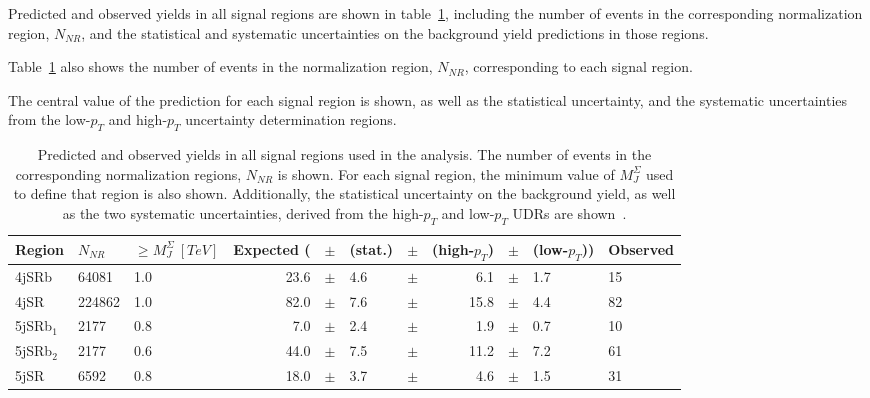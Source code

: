Predicted and observed yields in all signal regions are shown in table~\ref{tbl:results_yields_table},
including the number of events in the corresponding normalization region, $N_{NR}$, and the statistical and systematic
uncertainties on the background yield predictions in those regions.

Table~\ref{tbl:results_yields_table} also shows the number of events in the normalization region, $N_{NR}$,
corresponding to each signal region.

The central value of the prediction for each signal region is shown, as well as the statistical uncertainty,
and the systematic uncertainties from the low-$p_T$ and high-$p_T$ uncertainty determination regions.

\begin{table}[!ht]
    \centering

    \begin{tabular}{lllrlllrlll}
        \toprule
        Region & $N_{NR}$ & $\geq M_{J}^{\Sigma}~[TeV]$ & Expected ( & $\pm$ & (stat.) & $\pm$ & (high-$p_T$) & $\pm$ & (low-$p_T$)) & Observed \\
        \midrule
        4jSRb     & 64081    & 1.0                       & 23.6       & $\pm$ & 4.6     & $\pm$ & 6.1          & $\pm$ & 1.7          & 15 \\
        4jSR      & 224862   & 1.0                       & 82.0       & $\pm$ & 7.6     & $\pm$ & 15.8         & $\pm$ & 4.4          & 82 \\
        5jSRb$_1$ & 2177     & 0.8                       & 7.0        & $\pm$ & 2.4     & $\pm$ & 1.9          & $\pm$ & 0.7          & 10 \\
        5jSRb$_2$ & 2177     & 0.6                       & 44.0       & $\pm$ & 7.5     & $\pm$ & 11.2         & $\pm$ & 7.2          & 61 \\
        5jSR      & 6592     & 0.8                       & 18.0       & $\pm$ & 3.7     & $\pm$ & 4.6          & $\pm$ & 1.5          & 31 \\
        \bottomrule
    \end{tabular}

\caption{Predicted and observed yields in all signal regions used in the analysis.
The number of events in the corresponding normalization regions, $N_{NR}$ is shown.
For each signal region, the minimum value of $M_J^{\Sigma}$ used to define that region is also shown.
Additionally, the statistical uncertainty on the background yield, as well as the two systematic uncertainties,
derived from the high-$p_T$ and low-$p_T$ UDRs are shown~\cite{paper-plb}.}
\label{tbl:results_yields_table}
\end{table}

